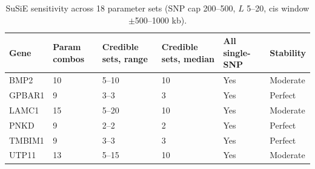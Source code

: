 \begin{table}[htbp]
\centering
\caption{SuSiE sensitivity across 18 parameter sets (SNP cap 200--500, $L$ 5--20, cis window $\pm$500--1000 kb).}\label{tab:susie_sensitivity}
\small
\begin{tabular}{llllll}
\toprule
  Gene & Param combos & Credible sets, range & Credible sets, median & All single-SNP & Stability \\
\midrule
  BMP2 & 10 & 5--10 & 10 & Yes & Moderate \\
  GPBAR1 & 9 & 3--3 & 3 & Yes & Perfect \\
  LAMC1 & 15 & 5--20 & 10 & Yes & Moderate \\
  PNKD & 9 & 2--2 & 2 & Yes & Perfect \\
  TMBIM1 & 9 & 3--3 & 3 & Yes & Perfect \\
  UTP11 & 13 & 5--15 & 10 & Yes & Moderate \\
\bottomrule
\end{tabular}

\end{table}
